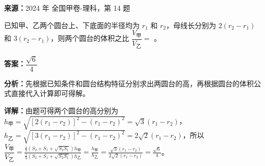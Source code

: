 \begin{question}[points=5]
\textbf{来源：}2024 年 全国甲卷-理科，第 14 题\par
已知甲、乙两个圆台上、下底面的半径均为 $r_1$ 和 $r_2$，母线长分别为 $2(r_2-r_1)$ 和 $3(r_2-r_1)$，则两个圆台的体积之比 $\dfrac{V_{\text{甲}}}{V_{\text{乙}}}=$ 。
\begin{solution}
\textbf{答案：}$\dfrac{\sqrt{6}}{4}$

\textbf{分析：}先根据已知条件和圆台结构特征分别求出两圆台的高，再根据圆台的体积公式直接代入计算即可得解。

\textbf{详解：}由题可得两个圆台的高分别为 $h_{\text{甲}}=\sqrt{[2(r_1-r_2)]^2-(r_1-r_2)^2}=\sqrt{3}(r_1-r_2)$，$h_{\text{乙}}=\sqrt{[3(r_1-r_2)]^2-(r_1-r_2)^2}=2\sqrt{2}(r_1-r_2)$，所以 $\dfrac{V_{\text{甲}}}{V_{\text{乙}}}=\frac{\frac{1}{3}(S_2+S_1+\sqrt{S_2S_1})h_{\text{甲}}}{\frac{1}{3}(S_2+S_1+\sqrt{S_2S_1})h_{\text{乙}}}=\frac{h_{\text{甲}}}{h_{\text{乙}}}=\frac{\sqrt{3}(r_1-r_2)}{2\sqrt{2}(r_1-r_2)}=\frac{\sqrt{6}}{4}$。
\end{solution}
\end{question}

